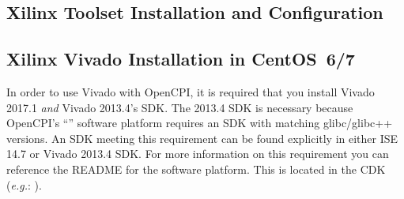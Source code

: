 \begin{flushleft}
\section{Xilinx Toolset Installation and Configuration}
\subsection{Xilinx Vivado Installation in CentOS~6/7}
\label{sec:viv_intro}
\begin{flushleft}
In order to use Vivado with OpenCPI, it is required that you install Vivado 2017.1 \textit{and} Vivado 2013.4's SDK. The 2013.4 SDK is necessary because OpenCPI's ``'' software platform requires an SDK with matching glibc/glibc++ versions. An SDK meeting this requirement can be found explicitly in either ISE 14.7 or Vivado 2013.4 SDK. For more information on this requirement you can reference the README for the  software platform. This is located in the CDK (\textit{e.g.}: ).

\end{flushleft}
\end{flushleft}
